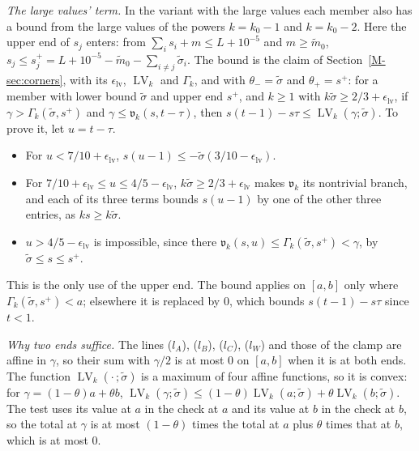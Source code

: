 \documentclass[11pt]{article}
\numberwithin{equation}{section}
\begin{document}
\emph{The large values' term.} In the variant with the large values each member also has a bound from the large values
of the powers $k = k_0 - 1$ and $k = k_0 - 2$. Here the upper end of $s_j$ enters: from $\sum_i s_i + m \le L +
10^{-5}$ and $m \ge \tilde m_0$, $s_j \le s_j^+ = L + 10^{-5} - \tilde m_0 - \sum_{i \ne j} \tilde\sigma_i$. The bound
is the claim of Section~\ref{M-sec:corners}, with its $\epsilon_{\mathrm{lv}}$, $\operatorname{LV}_k$ and $\Gamma_k$,
and with $\theta_- = \tilde\sigma$ and $\theta_+ = s^+$: for a member with lower bound $\tilde\sigma$ and upper end
$s^+$, and
$k \ge 1$ with $k\tilde\sigma \ge 2/3 + \epsilon_{\mathrm{lv}}$, if $\gamma > \Gamma_k(\tilde\sigma, s^+)$ and $\gamma
\le \mathfrak v_k(s, t - \tau)$, then $s(t - 1) - s\tau \le \operatorname{LV}_k(\gamma; \tilde\sigma)$. To prove it, let
$u = t - \tau$.
\begin{itemize}
\item For $u < 7/10 + \epsilon_{\mathrm{lv}}$, $s(u - 1) \le -\tilde\sigma(3/10 - \epsilon_{\mathrm{lv}})$.
\item For $7/10 + \epsilon_{\mathrm{lv}} \le u \le 4/5 - \epsilon_{\mathrm{lv}}$, $k\tilde\sigma \ge 2/3 +
  \epsilon_{\mathrm{lv}}$ makes $\mathfrak v_k$ its nontrivial branch, and each of its three terms bounds $s(u - 1)$
  by one of the other three entries, as $k s \ge k\tilde\sigma$.
\item $u > 4/5 - \epsilon_{\mathrm{lv}}$ is impossible, since there $\mathfrak v_k(s, u) \le \Gamma_k(\tilde\sigma,
  s^+) < \gamma$, by $\tilde\sigma \le s \le s^+$.
\end{itemize}
This is the only use of the upper end. The bound applies on $[a, b]$ only where $\Gamma_k(\tilde\sigma, s^+) < a$;
elsewhere it is replaced by $0$, which bounds $s(t - 1) - s\tau$ since $t < 1$.

\emph{Why two ends suffice.} The lines ($l_A$), ($l_B$), ($l_C$), ($l_W$) and those of the clamp are affine in $\gamma$,
so their sum with $\gamma/2$ is at most $0$ on $[a, b]$ when it is at both ends. The function
$\operatorname{LV}_k(\cdot\,; \tilde\sigma)$ is a maximum of four affine functions, so
it is convex: for $\gamma = (1 - \theta)a + \theta b$, $\operatorname{LV}_k(\gamma; \tilde\sigma) \le (1 -
\theta)\operatorname{LV}_k(a; \tilde\sigma) + \theta \operatorname{LV}_k(b; \tilde\sigma)$. The test uses its value
at $a$ in the check at $a$ and its value at $b$ in the check at $b$, so the total at $\gamma$ is at most $(1 - \theta)$
times the total at $a$ plus $\theta$ times that at $b$, which is at most $0$.
\end{document}
